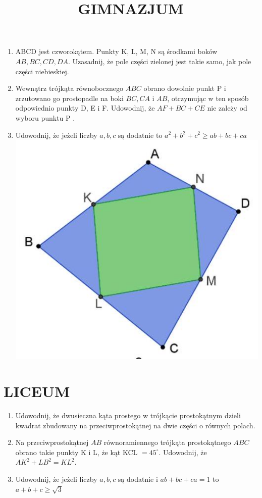 \documentclass[10pt]{article}
\title{GIMNAZJUM }
\author{}
\date{}
\begin{document}
\maketitle
\begin{enumerate}
  \item ABCD jest czworokątem. Punkty K, L, M, N są środkami boków \(A B, B C, C D, D A\). Uzasadnij, że pole części zielonej jest takie samo, jak pole części niebieskiej.
  \item Wewnątrz trójkąta równobocznego \(A B C\) obrano dowolnie punkt P i zrzutowano go prostopadle na boki \(B C, C A\) i \(A B\), otrzymując w ten sposób odpowiednio punkty D, E i F. Udowodnij, że \(A F+B C+C E\) nie zależy od wyboru punktu P .
  \item Udowodnij, że jeżeli liczby \(a, b, c\) są dodatnie to \(a^{2}+b^{2}+c^{2} \geq a b+b c+c a\)\\
\includegraphics[max width=\textwidth, center]{2024_11_21_c35196432bacdc36866cg-1}
\end{enumerate}

\section*{LICEUM}
\begin{enumerate}
  \item Udowodnij, że dwusieczna kąta prostego w trójkącie prostokątnym dzieli kwadrat zbudowany na przeciwprostokątnej na dwie części o równych polach.
  \item Na przeciwprostokątnej \(A B\) równoramiennego trójkąta prostokątnego \(A B C\) obrano takie punkty K i L, że kąt KCL \(=45^{\circ}\). Udowodnij, że \(A K^{2}+L B^{2}=K L^{2}\).
  \item Udowodnij, że jeżeli liczby \(a, b, c\) są dodatnie i \(a b+b c+c a=1\) to \(a+b+c \geq \sqrt{3}\)
\end{enumerate}
\end{document}
